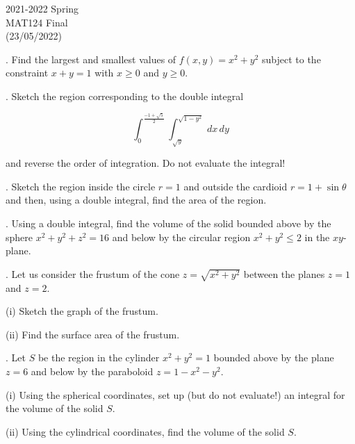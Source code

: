 \documentclass{article}
\begin{document}
\large

\begin{center}
2021-2022 Spring \\MAT124 Final\\(23/05/2022)
\end{center}

. Find the largest and smallest values of $f(x,y) = x^2+y^2$ subject to the constraint $x+y=1$ with $x\geq0$ and $y\geq0$.

\hfill

. Sketch the region corresponding to the double integral

\begin{equation*}
    \int_0^{\frac{-1+\sqrt5}{2}}\int_{\sqrt{y}}^{\sqrt{1-y^2}}\,dx\,dy
\end{equation*}

\hfill

\noindent and reverse the order of integration. Do not evaluate the integral!

\hfill

. Sketch the region inside the circle $r=1$ and outside the cardioid $r=1+\sin\theta$ and then, using a double integral, find the area of the region.

\hfill

. Using a double integral, find the volume of the solid bounded above by the sphere $x^2+y^2+z^2 = 16$ and below by the circular region $x^2+y^2\leq2$ in the $xy$-plane.

\hfill

. Let us consider the frustum of the cone $z=\sqrt{x^2+y^2}$ between the planes $z=1$ and $z=2$.

\hfill

\noindent (i) Sketch the graph of the frustum.

\hfill

\noindent (ii) Find the surface area of the frustum.

\hfill

. Let $S$ be the region in the cylinder $x^2+y^2 = 1$ bounded above by the plane $z=6$ and below by the paraboloid $z=1-x^2-y^2$.

\hfill

\noindent (i) Using the spherical coordinates, set up (but do not evaluate!) an integral for the volume of the solid $S$.

\hfill

\noindent (ii) Using the cylindrical coordinates, find the volume of the solid $S$.
\end{document}
